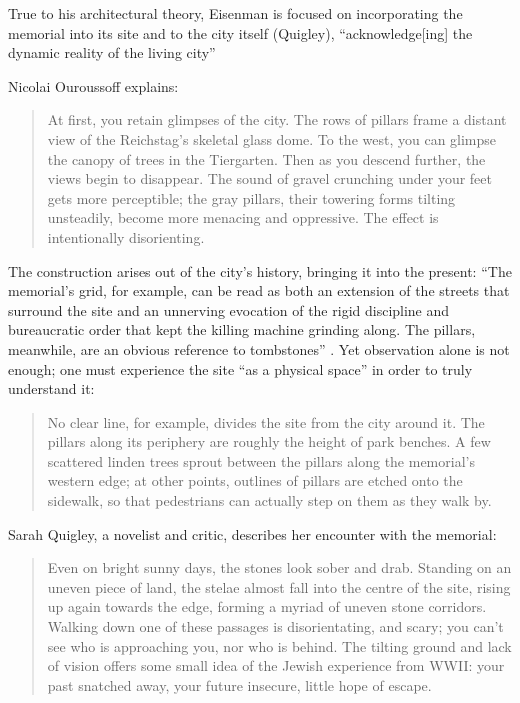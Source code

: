 True to his architectural theory, Eisenman is focused on
incorporating the memorial into its site and to the city itself
(Quigley), “acknowledge[ing] the dynamic reality of the living city” \citep[][p.~207]{eisenman2004}

Nicolai Ouroussoff explains: 


\begin{quote}
At first, you retain glimpses of the city.  The rows
of pillars frame a distant view of the Reichstag's
skeletal glass dome.  To the west, you can glimpse the canopy of trees
in the Tiergarten.  Then as you descend further, the views begin to
disappear.  The sound of gravel crunching under your feet gets more
perceptible; the gray pillars, their towering forms tilting unsteadily,
become more menacing and oppressive.  The effect is intentionally
disorienting. \citep{ouroussoff2005}
\end{quote}

The construction arises out of the city’s history,
bringing it into the present: “The memorial's grid,
for example, can be read as both an extension of the streets that
surround the site and an unnerving evocation of the rigid discipline
and bureaucratic order that kept the killing machine grinding along. 
The pillars, meanwhile, are an obvious reference to tombstones” \citep{ouroussoff2005}.  
Yet observation alone is not enough; one must
experience the site “as a physical space” in order to truly understand
it: 

\begin{quote}
No clear line, for example, divides the site from the
city around it.  The pillars along its periphery are roughly the height
of park benches.  A few scattered linden trees sprout between the
pillars along the memorial's western edge; at other
points, outlines of pillars are etched onto the sidewalk, so that
pedestrians can actually step on them as they walk by. \citep{ouroussoff2005}
\end{quote}

Sarah Quigley, a novelist and critic, describes her encounter with the
memorial: 

\begin{quote}
Even on bright sunny days, the
stones look sober and drab.  Standing on an uneven piece of land, the
stelae almost fall into the centre of the site, rising up again towards
the edge, forming a myriad of uneven stone corridors.  Walking down one
of these passages is disorientating, and scary; you can’t see who is
approaching you, nor who is behind.  The tilting ground and lack of
vision offers some small idea of the Jewish experience from WWII: your
past snatched away, your future insecure, little hope of escape. \citep{quigley2005}
\end{quote}


